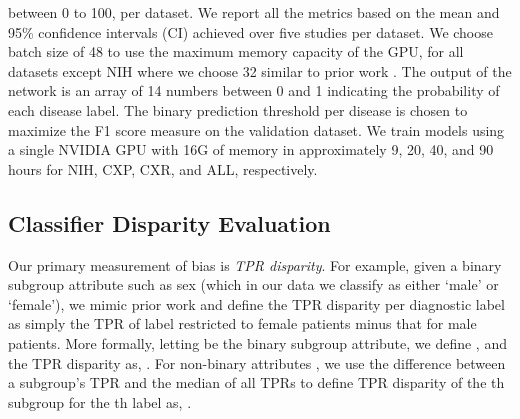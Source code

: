 \documentclass{ws-procs11x85}
\begin{document}
between 0 to 100, per dataset. We report all the metrics based on the mean and 95\% confidence intervals (CI) achieved over five studies per dataset. We choose batch size of 48 to use the maximum memory capacity of the GPU, for all datasets except NIH where we choose 32 similar to prior work \cite{rajpurkar_deep_2018}. 
The output of the network is an array of 14 numbers between 0 and 1 indicating the probability of each disease label.
The binary prediction threshold per disease is chosen to maximize the F1 score measure on the validation dataset. We train models using a single NVIDIA GPU with 16G of memory in approximately 9, 20, 40, and 90 hours for NIH, CXP, CXR, and ALL, respectively.

\subsection{Classifier Disparity Evaluation}
\label{sec:Formulation}
Our primary measurement of bias is \emph{TPR disparity}. For example, given a binary subgroup attribute such as sex (which in our data we classify as either `male' or `female'), we mimic prior work\cite{de2019bias} and define the TPR disparity per diagnostic label  as simply the TPR of label  restricted to female patients minus that for male patients. More formally, letting  be the binary subgroup attribute, we define , and the  TPR disparity as, . For non-binary attributes , we use the difference between a subgroup's TPR and the median of all TPRs to define TPR disparity of the th subgroup for the th label as, .
\end{document}
